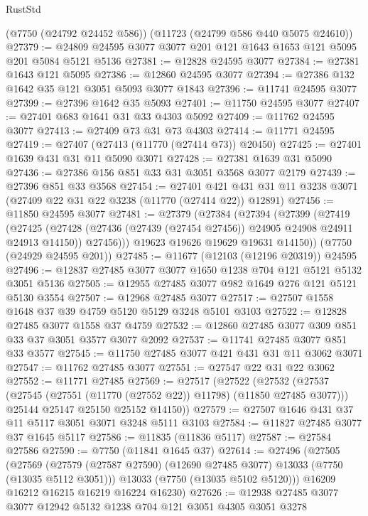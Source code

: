 \begin{lexlean}{RustStd}
\begin{coremodule}
    (@7750 (@24792 @24452 @586))
    (@11723 (@24799 @586 @440 @5075 @24610))
@27379 := @24809 @24595 @3077 @3077 @201 @121 @1643 @1653 @121 @5095 @201 @5084 @5121 @5136
@27381 := @12828 @24595 @3077
@27384 := @27381 @1643 @121 @5095
@27386 := @12860 @24595 @3077
@27394 := @27386 @132 @1642 @35 @121 @3051 @5093 @3077 @1843
@27396 := @11741 @24595 @3077
@27399 := @27396 @1642 @35 @5093
@27401 := @11750 @24595 @3077
@27407 := @27401 @683 @1641 @31 @33 @4303 @5092
@27409 := @11762 @24595 @3077
@27413 := @27409 @73 @31 @73 @4303
@27414 := @11771 @24595
@27419 := @27407 (@27413 (@11770 (@27414 @73)) @20450)
@27425 := @27401 @1639 @431 @31 @11 @5090 @3071
@27428 := @27381 @1639 @31 @5090
@27436 := @27386 @156 @851 @33 @31 @3051 @3568 @3077 @2179
@27439 := @27396 @851 @33 @3568
@27454 := @27401
    @421
    @431
    @31
    @11
    @3238
    @3071
    (@27409 @22 @31 @22 @3238 (@11770 (@27414 @22)) @12891)
@27456 := @11850 @24595 @3077
@27481 := @27379
    (@27384
      (@27394
        (@27399
          (@27419
            (@27425
              (@27428 (@27436 (@27439 (@27454 @27456)) @24905 @24908 @24911 @24913 @14150))
              @27456)))
        @19623
        @19626
        @19629
        @19631
        @14150))
    (@7750 (@24929 @24595 @201))
@27485 := @11677 (@12103 (@12196 @20319)) @24595
@27496 := @12837 @27485 @3077 @3077 @1650 @1238 @704 @121 @5121 @5132 @3051 @5136
@27505 := @12955 @27485 @3077 @982 @1649 @276 @121 @5121 @5130 @3554
@27507 := @12968 @27485 @3077
@27517 := @27507 @1558 @1648 @37 @39 @4759 @5120 @5129 @3248 @5101 @3103
@27522 := @12828 @27485 @3077 @1558 @37 @4759
@27532 := @12860 @27485 @3077 @309 @851 @33 @37 @3051 @3577 @3077 @2092
@27537 := @11741 @27485 @3077 @851 @33 @3577
@27545 := @11750 @27485 @3077 @421 @431 @31 @11 @3062 @3071
@27547 := @11762 @27485 @3077
@27551 := @27547 @22 @31 @22 @3062
@27552 := @11771 @27485
@27569 := @27517
    (@27522
      (@27532
        (@27537 (@27545 (@27551 (@11770 (@27552 @22)) @11798) (@11850 @27485 @3077)))
        @25144
        @25147
        @25150
        @25152
        @14150))
@27579 := @27507 @1646 @431 @37 @11 @5117 @3051 @3071 @3248 @5111 @3103
@27584 := @11827 @27485 @3077 @37 @1645 @5117
@27586 := @11835 (@11836 @5117)
@27587 := @27584 @27586
@27590 := @7750 (@11841 @1645 @37)
@27614 := @27496
    (@27505
      (@27569
        (@27579 (@27587 @27590) (@12690 @27485 @3077) @13033 (@7750 (@13035 @5112 @3051)))
        @13033
        (@7750 (@13035 @5102 @5120)))
      @16209
      @16212
      @16215
      @16219
      @16224
      @16230)
@27626 := @12938 @27485 @3077 @3077 @12942 @5132 @1238 @704 @121 @3051 @4305 @3051 @3278

\end{coremodule}
\end{lexlean}
